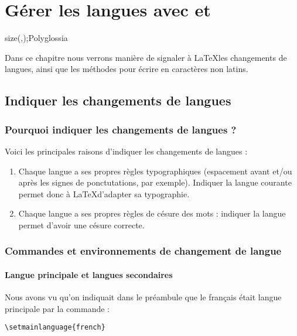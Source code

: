 \chapter{Gérer les langues avec  et }\sindex[pkg]size(,);{Polyglossia}\label{i18n}

\begin{prealable}
	Dans ce chapitre nous verrons manière de signaler à \LaTeX les changements de langues, ainsi que les méthodes pour écrire en caractères non latins.
\end{prealable}

\section{Indiquer les changements de langues}

\subsection{Pourquoi indiquer les changements de langues ?}

Voici les principales raisons d'indiquer les changements de langues :
\begin{enumerate}
\item Chaque langue  a ses propres règles typographiques (espacement avant et/ou après les signes de ponctutations, par exemple). Indiquer la langue courante permet donc à \LaTeX d'adapter sa typographie.
\item Chaque langue a ses propres règles de césure des mots : indiquer la langue permet d'avoir une césure correcte.
\end{enumerate}


\subsection{Commandes et environnements de changement de langue}

\subsubsection{Langue principale et langues secondaires}

Nous avons vu qu'on indiquait dans le préambule que le français était langue principale par la commande : 

\begin{verbatim}
\setmainlanguage{french}
\end{verbatim}

